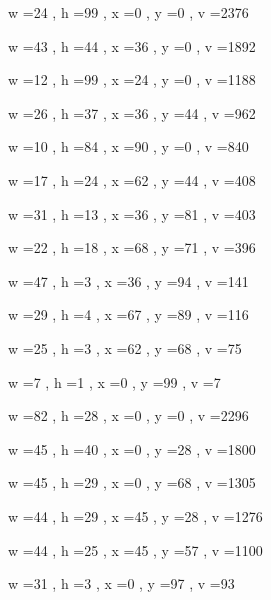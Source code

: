 \documentclass[11pt]{article}
\begin{document}
w =24 , h =99 , x =0 , y =0 , v =2376
\par
w =43 , h =44 , x =36 , y =0 , v =1892
\par
w =12 , h =99 , x =24 , y =0 , v =1188
\par
w =26 , h =37 , x =36 , y =44 , v =962
\par
w =10 , h =84 , x =90 , y =0 , v =840
\par
w =17 , h =24 , x =62 , y =44 , v =408
\par
w =31 , h =13 , x =36 , y =81 , v =403
\par
w =22 , h =18 , x =68 , y =71 , v =396
\par
w =47 , h =3 , x =36 , y =94 , v =141
\par
w =29 , h =4 , x =67 , y =89 , v =116
\par
w =25 , h =3 , x =62 , y =68 , v =75
\par
w =7 , h =1 , x =0 , y =99 , v =7
\par
\newpage




w =82 , h =28 , x =0 , y =0 , v =2296
\par
w =45 , h =40 , x =0 , y =28 , v =1800
\par
w =45 , h =29 , x =0 , y =68 , v =1305
\par
w =44 , h =29 , x =45 , y =28 , v =1276
\par
w =44 , h =25 , x =45 , y =57 , v =1100
\par
w =31 , h =3 , x =0 , y =97 , v =93
\par
\newpage
\end{document}
